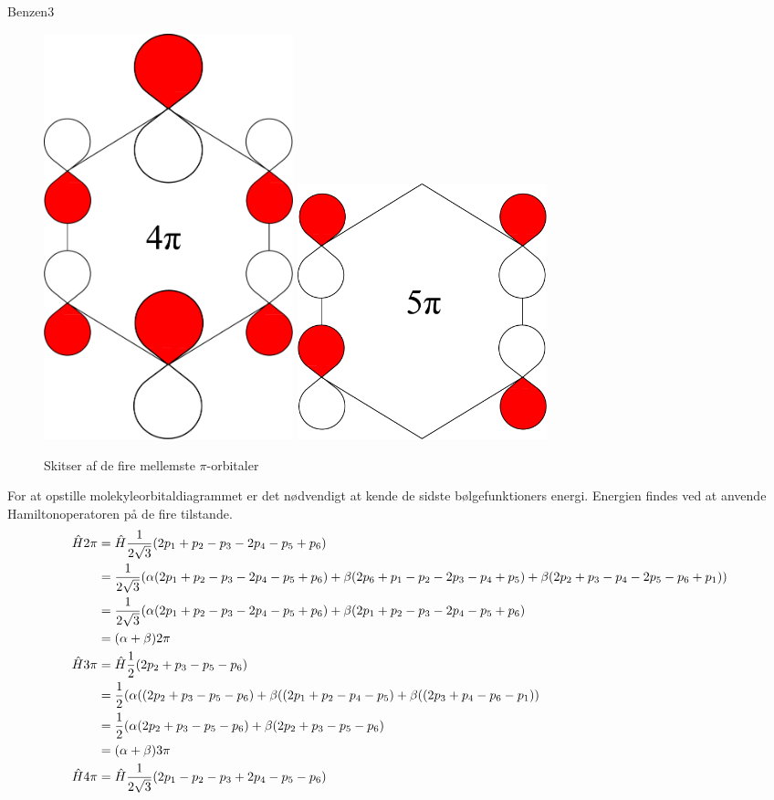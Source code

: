 \begin{opgave}{Benzen}{3}
\begin{figure}[h]
\includegraphics[width = 0.35\textwidth]{Atom-ogMolekylefysik/billeder/benzen4.pdf}
\includegraphics[width = 0.35\textwidth]{Atom-ogMolekylefysik/billeder/benzen5.pdf}
\caption{Skitser af de fire mellemste $\pi$-orbitaler}
\end{figure}
\opg
For at opstille molekyleorbitaldiagrammet er det nødvendigt at kende de sidste bølgefunktioners energi. Energien findes ved at anvende Hamiltonoperatoren på de fire tilstande.
\begin{align*}
\op H 2\pi &= \op H \frac{1}{2\sqrt{3}}(2p_1+p_2-p_3-2p_4-p_5+p_6)\\
&= \frac{1}{2\sqrt{3}}(\alpha(2p_1+p_2-p_3-2p_4-p_5+p_6)+\beta(2p_6+p_1-p_2-2p_3-p_4+p_5)+\beta(2p_2+p_3-p_4-2p_5-p_6+p_1))\\
&=\frac{1}{2\sqrt{3}}(\alpha(2p_1+p_2-p_3-2p_4-p_5+p_6)+\beta(2p_1+p_2-p_3-2p_4-p_5+p_6)\\
&=(\alpha+\beta)2\pi\\
\op H 3\pi &= \op H\frac{1}{2} (2p_2+p_3-p_5-p_6)\\
&= \frac{1}{2}(\alpha((2p_2+p_3-p_5-p_6)+\beta((2p_1+p_2-p_4-p_5)+\beta((2p_3+p_4-p_6-p_1))\\
&=\frac{1}{2}(\alpha(2p_2+p_3-p_5-p_6)+\beta(2p_2+p_3-p_5-p_6)\\
&=(\alpha+\beta)3\pi\\
\op H 4\pi &= \op H \frac{1}{2\sqrt{3}}(2p_1-p_2-p_3+2p_4-p_5-p_6)\\

\end{align*}
\end{opgave}
